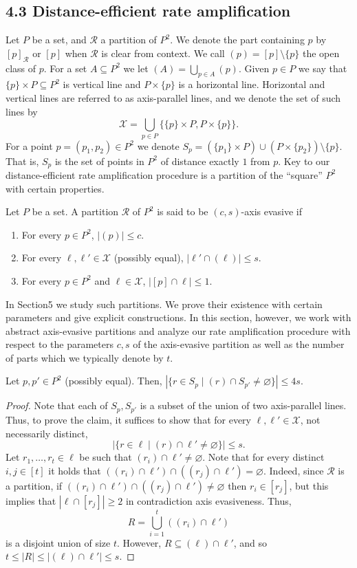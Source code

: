 \subsection*{4.3 Distance-efficient rate amplification}
Let $P$ be a set, and $\mathcal R$ a partition of $P^2$. We denote the part containing $p$ by $[p]_{\mathcal R}$ or $[p]$ when $\mathcal R$ is clear from context. We call $(p)=[p]\setminus\{p\}$ the open class of $p$. For a set $A\subseteq P^2$ we let $(A)=\bigcup_{p\in A}(p)$. Given $p\in P$ we say that $\{p\}\times P\subseteq P^2$ is vertical line and $P\times\{p\}$ is a horizontal line. Horizontal and vertical lines are referred to as axis-parallel lines, and we denote the set of such lines by
\[\mathcal X=\bigcup_{p\in P}\{\{p\}\times P,P\times\{p\}\}.\]
For a point $p=(p_1,p_2)\in P^2$ we denote $S_p=(\{p_1\}\times P)\cup(P\times\{p_2\})\setminus\{p\}$. That is, $S_p$ is the set of points in $P^2$ of distance exactly $1$ from $p$. Key to our distance-efficient rate amplification procedure is a partition of the ``square'' $P^2$ with certain properties.
\setcounter{nttheorem}{34}
\begin{ntdefinition}
Let $P$ be a set. A partition $\mathcal R$ of $P^2$ is said to be $(c,s)$-axis evasive if
\begin{enumerate}
\item For every $p\in P^2$, $|(p)|\leq c$.
\item For every $\ell,\ell'\in\mathcal X$ (possibly equal), $|\ell'\cap(\ell)|\leq s$.
\item For every $p\in P^2$ and $\ell\in\mathcal X$, $|[p]\cap\ell|\leq1$.
\end{enumerate}
\end{ntdefinition}
In Section5 we study such partitions. We prove their existence with certain parameters and give explicit constructions. In this section, however, we work with abstract axis-evasive partitions and analyze our rate amplification procedure with respect to the parameters $c,s$ of the axis-evasive partition as well as the number of parts which we typically denote by $t$.
\begin{ntclaim}
Let $p,p'\in P^2$ (possibly equal). Then, $|\{r\in S_p\mid(r)\cap S_{p'}\ne\varnothing\}|\leq4s$.
\end{ntclaim}
\begin{proof}
Note that each of $S_p,S_{p'}$ is a subset of the union of two axis-parallel lines. Thus, to prove the claim, it suffices to show that for every $\ell,\ell'\in\mathcal X$, not necessarily distinct,
\[|\{r\in\ell\mid(r)\cap\ell'\ne\varnothing\}|\leq s.\]
Let $r_1,\ldots,r_t\in\ell$ be such that $(r_i)\cap\ell'\ne\varnothing$. Note that for every distinct $i,j\in[t]$ it holds that $((r_i)\cap\ell')\cap((r_j)\cap\ell')=\varnothing$. Indeed, since $\mathcal R$ is a partition, if $((r_i)\cap\ell')\cap((r_j)\cap\ell')\ne\varnothing$ then $r_i\in[r_j]$, but this implies that $|\ell\cap[r_j]|\geq2$ in contradiction axis evasiveness. Thus,
\[R=\bigcup_{i=1}^t((r_i)\cap\ell')\]
is a disjoint union of size $t$. However, $R\subseteq(\ell)\cap\ell'$, and so $t\leq|R|\leq|(\ell)\cap\ell'|\leq s$.
\end{proof}
